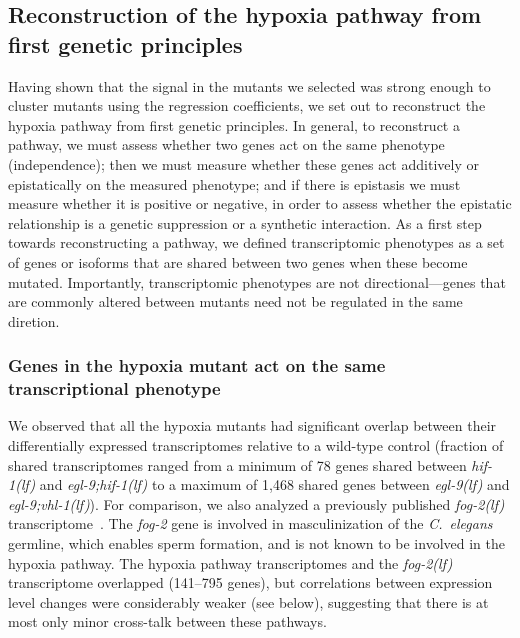 \documentclass[9pt,twocolumn,twoside]{pnas-new}
\newcommand{\cel}{\emph{C.~elegans}}
\newcommand{\gene}[1]{\emph{#1}}
\newcommand{\fog}{\emph{fog-2(lf)}}
\newcommand{\egl}{\emph{egl-9(lf)}}
\newcommand{\eglvhl}{\emph{egl-9;vhl-1(lf)}}
\newcommand{\eglhif}{\emph{egl-9;hif-1(lf)}}
\newcommand{\hif}{\emph{hif-1(lf)}}
\begin{document}
\subsection*{Reconstruction of the hypoxia pathway from first genetic principles}
\label{sec:reconstruct}
Having shown that the signal in the mutants we selected was strong enough to
cluster mutants using the regression coefficients, we set out to reconstruct the
hypoxia pathway from first genetic principles. In general, to reconstruct a pathway,
we must assess whether two genes act on the same phenotype (independence);
then we must measure whether these genes act additively or epistatically on the
measured phenotype; and if there is epistasis we must measure whether it is positive
or negative, in order to assess whether the epistatic relationship is a genetic
suppression or a synthetic interaction. As a first step towards reconstructing
a pathway, we defined transcriptomic phenotypes as a set of genes or isoforms
that are shared between two genes when these become mutated. Importantly,
transcriptomic phenotypes are not directional---genes that are commonly altered
between mutants need not be regulated in the same diretion.

\subsubsection{Genes in the hypoxia mutant act on the same transcriptional phenotype}
\label{sec:phenotypes}
We observed that all the hypoxia mutants had significant overlap between their
differentially expressed transcriptomes relative to a wild-type control
(fraction of shared transcriptomes ranged from a minimum of 78 genes
shared between \hif{} and \eglhif{} to a maximum of 1,468 shared genes between
\egl{} and \eglvhl{}). For comparison, we also analyzed a previously published
\fog{} transcriptome~\cite{Angeles-Albores2016a}. The \gene{fog-2} gene is
involved in masculinization of the \cel{} germline, which enables sperm formation,
and is not known to be involved in the hypoxia pathway. The hypoxia
pathway transcriptomes and the \fog{} transcriptome overlapped (141--795 genes),
but correlations between expression level changes were considerably weaker (see
below), suggesting that there is at most only minor cross-talk between these
pathways.
\end{document}
